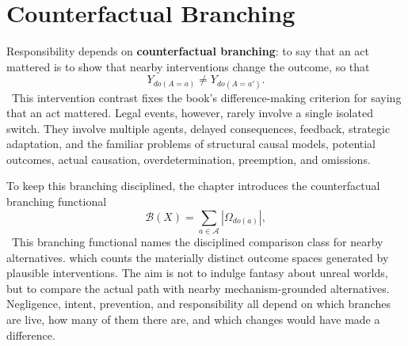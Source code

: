 
\chapter{Counterfactual Branching}
\label{ch:ch013}

Responsibility depends on \textbf{counterfactual branching}: to say that an act mattered is to show that nearby interventions change the outcome, so that
\[
Y_{do(A=a)}\neq Y_{do(A=a')}.
\]
\Definition\ This intervention contrast fixes the book's difference-making criterion for saying that an act mattered.
Legal events, however, rarely involve a single isolated switch. They involve multiple agents, delayed consequences, feedback, strategic adaptation, and the familiar problems of structural causal models, potential outcomes, actual causation, overdetermination, preemption, and omissions.

To keep this branching disciplined, the chapter introduces the counterfactual branching functional
\[
\mathcal B(X)
=
\sum_{a\in\mathcal A}
|\Omega_{do(a)}|,
\]
\Definition\ This branching functional names the disciplined comparison class for nearby alternatives.
which counts the materially distinct outcome spaces generated by plausible interventions. The aim is not to indulge fantasy about unreal worlds, but to compare the actual path with nearby mechanism-grounded alternatives. Negligence, intent, prevention, and responsibility all depend on which branches are live, how many of them there are, and which changes would have made a difference.
